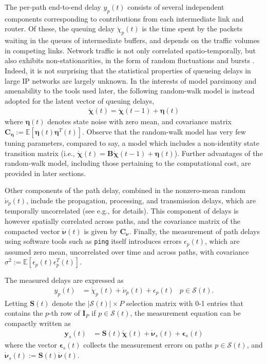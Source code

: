 \documentclass[draftcls,onecolumn,12pt]{IEEEtran}
\providecommand{\abs}[1]{\lvert#1\rvert}												\renewcommand{\b}[1]{\ensuremath{\mathbf{#1}}}		 							\newcommand{\bs}[1]{\ensuremath{\boldsymbol{#1}}}		 						\renewcommand{\c}[1]{\ensuremath{\mathcal{#1}}} 								\newcommand{\E}[1]{\ensuremath{\mathbb{E}\left[#1\right]}} 		  \newcommand{\Es}[1]{\ensuremath{\mathbb{E}^{*}\left[#1\right]}} \newcommand{\ind}{1\hspace{-1.6mm}1}														\newcommand{\norm}[1]{\ensuremath{\left\|#1\right\|}}						\newcommand{\tb}[1]{\ensuremath{\tilde{\mathbf{#1}}}}		 				\newcommand{\mat}[1]{\ensuremath{\begin{bmatrix}#1\end{bmatrix}}}
\newcommand{\mr}[1]{\ensuremath{\mathring{#1}}}
\def \y {{\b{y}}}
\def \ypt {{y_p(t)}}
\def \epst {{\bs{\epsilon}_s(t)}}
\def \ceta {{\b{C}_{\bs{\eta}}}}
\def \cnu {{\b{C}_{\bs{\nu}}}}
\def \St {{\b{S}(t)}}
\theoremstyle{plain}\newtheorem{thm}{Theorem}
\theoremstyle{definition}
\theoremstyle{remark}
\begin{document}
The per-path end-to-end delay $\ypt$ consists of several independent components corresponding to contributions from each intermediate link and router. 
Of these, the queuing delay $\mr{\chi}_p(t)$ is the time spent by the packets waiting in the queues of intermediate buffers, and depends on the traffic volumes in competing links. 
{ Network traffic is not only correlated spatio-temporally, but also exhibits non-stationarities, in the form of random fluctuations and bursts \cite{structural}.
Indeed, it is not surprising that the statistical properties of queueing delays in large IP networks are largely unknown.
In the interests of model parsimony and amenability to the tools used later, the following random-walk model is instead adopted for the latent vector of queuing delays,
\begin{align}\label{eq:xi}
\mr{\bs{\chi}}(t) = \mr{\bs{\chi}}(t-1) + \bs{\eta}(t)
\end{align}
where $\bs{\eta}(t)$ denotes state noise with zero mean, and covariance matrix $\ceta:=\E{\bs{\eta}(t) \bs{\eta}^T(t)}$. Observe that the random-walk model has very few tuning parameters, compared to say, a model which includes a non-identity state transition matrix (i.e., $\mr{\bs{\chi}}(t) = \bs{B}\mr{\bs{\chi}}(t-1) + \bs{\eta}(t)$). Further advantages of the random-walk model, including those pertaining to the computational cost, are provided in later sections.}

Other components of the path delay, combined in the nonzero-mean random $\mr{\nu}_p(t)$, include the propagation, processing, and transmission delays, which are temporally uncorrelated (see e.g., \cite{bovy} for details).
This component of delays is however spatially correlated across paths, and the covariance matrix of the compacted vector $\mr{\bs{\nu}}(t)$ is given by $\cnu$.
Finally, the measurement of path delays using software tools such as \texttt{ping} itself introduces errors $\epsilon_p(t)$, which are assumed zero mean, uncorrelated over time and across paths, with covariance $\sigma^2:=\E{\epsilon_p(t)\epsilon_p^T(t)}$.

The measured delays are expressed as
\begin{align}
\ypt &= \mr{\chi}_p(t) + \mr{\nu}_p(t) + \epsilon_p(t) & p \in \c{S}(t). \nonumber
\end{align}
Letting $\St$ denote the $\abs{\c{S}(t)} \times P$ selection matrix with 0-1 entries that contains the $p$-th row of $\b{I}_{P}$ if $p \in \c{S}(t)$, the measurement equation can be compactly written as
\begin{align}
\label{eq:meas0}
\y_{s}(t) &= \St\mr{\bs{\chi}}(t) + \mr{\bs{\nu}}_s(t) + \epst
\end{align}
where the vector $\epst$ collects the measurement errors on paths $p \in \c{S}(t)$, and $\mr{\bs{\nu}}_s(t):=\St\mr{\bs{\nu}}(t)$. 
\end{document}
